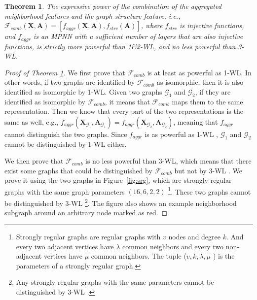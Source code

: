 \documentclass{article}
\theoremstyle{plain}
\newtheorem{theorem}{Theorem}
\begin{document}
\begin{theorem} \label{thm:powerful}
The expressive power of the combination of the aggregated neighborhood features and the graph structure feature, i.e., $\mathcal{F}_{comb}(\mathbf{X},\mathbf{A})=[f_{aggr}(\mathbf{X},\mathbf{A}), f_{strc}(\mathbf{A})]$, where $f_{strc}$ is injective functions, and $f_{aggr}$ is an MPNN with a sufficient number of layers that are also injective functions, is strictly more powerful than 1\&2-WL, and no less powerful than 3-WL. 
\end{theorem}
\vspace{-10pt}
\begin{proof}[Proof of Theorem \ref{thm:powerful}] 
We first prove that $\mathcal{F}_{comb}$ is at least as powerful as 1-WL. 
In other words, if two graphs are identified by $\mathcal{F}_{comb}$ as isomorphic, then it is also identified as isomorphic by 1-WL. 
Given two graphs $\mathcal{G}_1$ and $\mathcal{G}_2$,  if they are identified as isomorphic by $\mathcal{F}_{comb}$, it means that $\mathcal{F}_{comb}$ maps them to the same representation. 
Then we know that every part of the two representations is the same as well, e.g., $f_{aggr}(\mathbf{X}_{\mathcal{G}_1},\mathbf{A}_{\mathcal{G}_1})=f_{aggr}(\mathbf{X}_{\mathcal{G}_2},\mathbf{A}_{\mathcal{G}_2})$, meaning that $f_{aggr}$ cannot distinguish the two graphs. Since $f_{aggr}$ is as powerful as 1-WL \cite{maron2019provably, azizian2020expressive}, $\mathcal{G}_1$ and $\mathcal{G}_2$ cannot be distinguished by 1-WL either.

We then prove that $\mathcal{F}_{comb}$ is no less powerful than 3-WL, which means that there exist some graphs that could be distinguished by $\mathcal{F}_{comb}$ but not by 3-WL \cite{chen2020can}. 
We prove it using the two graphs in Figure~\ref{fig:srg}, which are strongly regular graphs with the same graph parameters $(16,6,2,2)$ \footnote{Strongly regular graphs are regular graphs with $v$ nodes and degree $k$. And every two adjacent vertices have $\lambda$ common neighbors and every two non-adjacent vertices have $\mu$ common neighbors. The tuple ($v, k, \lambda, \mu$ ) is the parameters of a strongly regular graph.}. These two graphs cannot be distinguished by 3-WL \footnote{Any strongly regular graphs with the same parameters cannot be distinguished by 3-WL \cite{arvind2020weisfeiler}.}. 
The figure also shows an example neighborhood subgraph around an arbitrary node marked as red. 


\end{proof}
\end{document}
